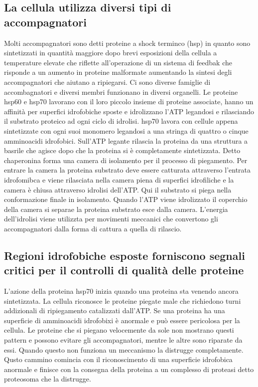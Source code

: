 \subsection{La cellula utilizza diversi tipi di accompagnatori}
Molti accompagnatori sono detti proteine a shock terminco (hsp) in quanto sono sintetizzati in quantit\`a maggiore dopo brevi esposizioni della cellula a temperature elevate che
riflette all'operazione di un sistema di feedbak che risponde a un aumento in proteine malformate aumentando la sintesi degli accompagnatori che aiutano a ripiegarsi. Ci sono diverse
famiglie di accombagnatori e diversi membri funzionano in diversi organelli. Le proteine hsp60 e hsp70 lavorano con il loro piccolo insieme di proteine associate, hanno un affinit\`a
per superfici idrofobiche sposte e idrolizzano l'ATP legandosi e rilasciando il substrato proteico ad ogni ciclo di idrolisi. hsp70 lavora con cellule appena sintetizzate con ogni
suoi monomero legandosi a una stringa di quattro o cinque amminoacidi idrofobici. Sull'ATP legante rilascia la proteina da una struttura a basrile che agisce dopo che la proteina si \`e
completamente sintetizzata. Detto chaperonina forma una camera di isolamento per il processo di piegamento. Per entrare la camera la proteina substrato deve essere catturata attraverso
l'entrata idrofomibca e viene rilasciata nella camera piena di superfici idrofiliche e la camera \`e chiusa attraverso idrolisi dell'ATP. Qui il substrato si piega nella conformazione
finale in isolamento. Quando l'ATP viene idrolizzato il coperchio della camera si separae la proteina substrato esce dalla camera. L'energia dell'idrolisi viene utilizzta per 
movimenti meccanici che convertono gli accompagnatori dalla forma di cattura a quella di rilascio. 
\subsection{Regioni idrofobiche esposte forniscono segnali critici per il controlli di qualit\`a delle proteine}
L'azione della proteina hsp70 inizia quando una proteina sta venendo ancora sintetizzata. La cellula riconosce le proteine piegate male che richiedono turni addizionali di ripiegamento
catalizzati dall'ATP. Se una proteina ha una superficie di amminoacidi idrofobixi \`e anormale e pu\`o essere pericolosa per la cellula. Le proteine che si piegano velocemente da sole
non mostrano questi pattern e possono evitare gli accompagnatori, mentre le altre sono riparate da essi. Quando questo non funziona un meccanismo la distrugge completamente. Qusto 
cammino comincia con il riconoscimento di una superficie idrofobica anormale e finisce con la consegna della proteina a un complesso di proteasi detto proteosoma che la distrugge. 
